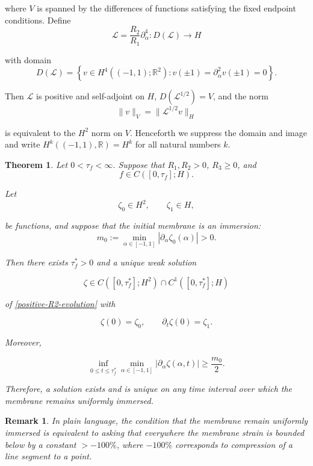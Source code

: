\documentclass{article}[12pt]
\theoremstyle{Theorem}
\newtheorem{theorem}{Theorem}
\newtheorem{remark}{Remark}
\begin{document}
where \(V\) is spanned by the differences of functions satisfying the fixed endpoint conditions. Define
$$
    \mathcal{L}=\frac{R_2}{R_1}\partial_\alpha^4:D(\mathcal{L}) \rightarrow H
$$

with domain
$$
    D(\mathcal{L})=
    \left\{
        v\in H^4((-1,1);\mathbb R^2):
        v(\pm1)=\partial_\alpha^2v(\pm1)=0
    \right\}.
$$

Then \(\mathcal{L}\) is positive and self-adjoint on \(H\), \(D(\mathcal{L}^{1/2})=V\), and the norm
$$
    \|v\|_V=\|\mathcal{L}^{1/2}v\|_H
$$

is equivalent to the \(H^2\) norm on \(V\). Henceforth we suppress the domain and image and write $H^k((-1,1),\mathbb{R}) = H^k$ for all natural numbers $k$.

\begin{theorem}\label{Thm1}
Let $0<\tau_f < \infty$. Suppose that \(R_1,R_2>0\), \(R_3\geq0\), and
$$
    f\in C([0,\tau_f];H).
$$

Let 
$$
    \zeta_0\in H^2,
    \qquad
    \zeta_1\in H,
$$

be functions, and suppose that the initial membrane is an immersion:
$$
    m_0:=
    \min_{\alpha\in[-1,1]}
    |\partial_\alpha\zeta_0(\alpha)|>0.
$$

Then there exists \(\tau_f^*>0\) and a unique weak solution

$$
    \zeta\in C([0,\tau_f^*];H^2)
    \cap C^1([0,\tau_f^*];H)
$$

of \eqref{positive-R2-evolution} with

$$
    \zeta(0)=\zeta_0,
    \qquad
    \partial_t\zeta(0)=\zeta_1.
$$

Moreover,

$$
    \inf_{0\leq t\leq \tau_f^*}
    \min_{\alpha\in[-1,1]}
    |\partial_\alpha\zeta(\alpha,t)|
    \geq\frac{m_0}{2}.
$$

Therefore, a solution exists and is unique on any time interval over which the membrane remains uniformly immersed.

\end{theorem}
\begin{remark}
    In plain language, the condition that the membrane remain uniformly immersed is equivalent to asking that everywhere the membrane strain is bounded below by a constant $> -100\%$, where $-100\%$ corresponds to compression of a line segment to a point. 
\end{remark}
\end{document}
